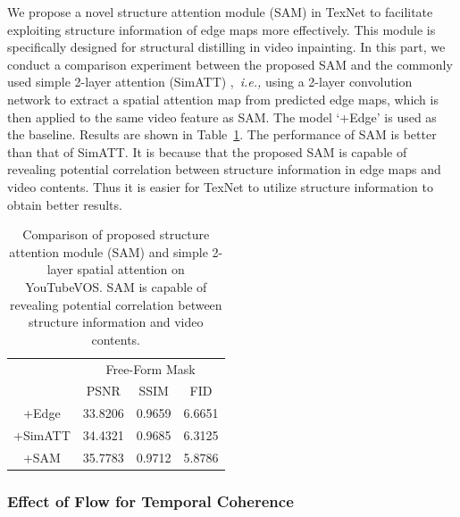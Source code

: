 We propose a novel structure attention module (SAM) in TexNet to facilitate exploiting structure information of edge maps more effectively. This module is specifically designed for structural distilling in video inpainting. In this part, we conduct a comparison experiment between the proposed SAM and the commonly used simple 2-layer attention (SimATT) \cite{min2019two},~\emph{i.e.,} using a 2-layer convolution network to extract a spatial attention map from predicted edge maps, which is then applied to the same video feature as SAM. 
The model `+Edge' is used as the baseline.
Results are shown in Table~\ref{tab:sam_com}.
The performance of SAM is better than that of SimATT. It is because that the proposed SAM is capable of revealing potential correlation between structure information in edge maps and video contents.
Thus it is easier for TexNet to utilize structure information to obtain better results.



\begin{table}[t]
	\caption{Comparison of proposed structure attention module (SAM) and simple 2-layer spatial attention on YouTubeVOS. SAM is capable of revealing potential correlation between structure information and video contents. }\smallskip
	\scriptsize
	\centering
	{
		\smallskip\begin{tabular}{c|c|c|c}
			\hline
			&\multicolumn{3}{c}{Free-Form Mask} \\
			\cline{2-4} 
			& PSNR & SSIM & FID\\
			
			\hline
			+Edge  &33.8206    &0.9659  &    6.6651 \\
			\hline
			
			+SimATT &34.4321    &0.9685  &   6.3125 \\
			
			\hline
			
			+SAM &35.7783    &0.9712  &   5.8786\\
			\hline
			
		
			
			
		\end{tabular}
	}
	\label{tab:sam_com}
\end{table}





\subsubsection{Effect of Flow for Temporal Coherence}

